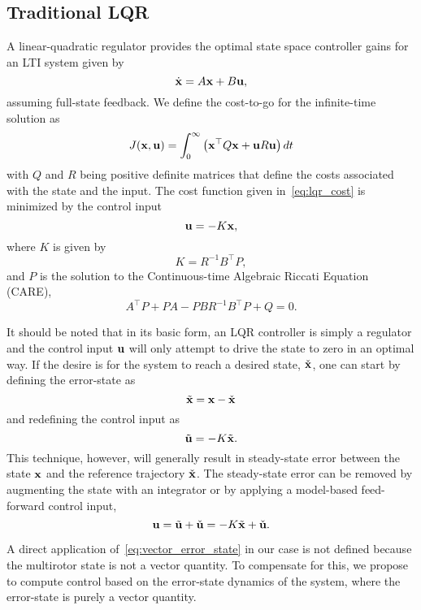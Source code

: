 
\subsection{Traditional LQR}

A linear-quadratic regulator provides the optimal state space controller gains
for an LTI  system given by
\begin{equation}
\dot{{\bf x}}=A{\bf x}+B{\bf u},
\end{equation}
assuming full-state feedback. We define the cost-to-go for the infinite-time solution as
\begin{equation}
  J(\boldsymbol{\mathrm{x}},\boldsymbol{\mathrm{u}})=\int_{0}^{\infty}\left(\boldsymbol{\mathrm{x}}^{\top}Q\boldsymbol{\mathrm{x}}+\boldsymbol{\mathrm{u}}R\boldsymbol{\mathrm{u}}\right)dt
\label{eq:lqr_cost}
\end{equation}
with $Q$ and $R$ being positive definite matrices that
define the costs associated with the state and the input. The cost function
given in~\eqref{eq:lqr_cost} is minimized by the control input
\begin{equation}
  \boldsymbol{\mathrm{u}} = -K\boldsymbol{\mathrm{x}},
\end{equation}
where $K$ is given by
\begin{equation}
  K = R^{-1}B^{\top}P,
\end{equation}
and $P$ is the solution to the Continuous-time Algebraic Riccati Equation (CARE),
\begin{equation}
  A^{\top}P + PA -PBR^{-1}B^{\top}P + Q = 0.
\end{equation}

It should be noted that in its basic form, an LQR controller is simply a
regulator and the control input $\boldsymbol{\mathrm{u}}$ will only attempt to drive the state
to zero in an optimal way. If the desire is for the system to reach a desired
state, $\check{\boldsymbol{\mathrm{x}}}$, one can start by defining the error-state as
\begin{equation}
  \tilde{\boldsymbol{\mathrm{x}}}=\boldsymbol{\mathrm{x}}-\check{\boldsymbol{\mathrm{x}}}
  \label{eq:vector_error_state}
\end{equation}
and redefining the control input as
\begin{equation}
  \tilde{\boldsymbol{\mathrm{u}}} = -K\tilde{\boldsymbol{\mathrm{x}}}.
\end{equation}
This technique, however, will generally result in steady-state error between the
state $\boldsymbol{\mathrm{x}}$ and the reference trajectory $\check{\boldsymbol{\mathrm{x}}}$. The steady-state error can be removed by augmenting the state with an integrator or by applying a model-based feed-forward control input,
\begin{equation}
  \boldsymbol{\mathrm{u}} = \tilde{\boldsymbol{\mathrm{u}}} + \check{\boldsymbol{\mathrm{u}}} = -K\tilde{\boldsymbol{\mathrm{x}}} + \check{\boldsymbol{\mathrm{u}}}.
\end{equation}

A direct application of~\eqref{eq:vector_error_state} in our case is not defined
because the multirotor state is not a vector quantity.
To compensate for this, we propose to compute control based
on the error-state dynamics of the system, where the error-state is purely a vector
quantity.
